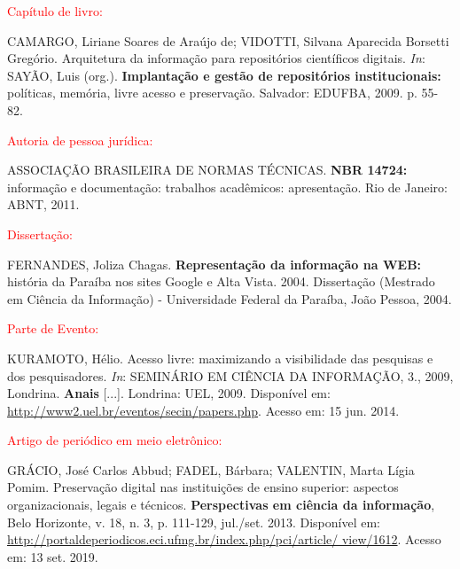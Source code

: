 \documentclass[
	12pt,				%
	openright,			%
	oneside,			%
	a4paper,			%
	english,			%
	french,				%
	spanish,			%
	brazil				%
	]{abntex2UFMT}
\begin{document}
\textcolor{red}{Capítulo de livro:}
\begin{flushleft}
\begin{SingleSpace}
CAMARGO, Liriane Soares de Araújo de; VIDOTTI, Silvana Aparecida Borsetti Gregório. Arquitetura da informação para repositórios científicos digitais. \textit{In}: SAYÃO, Luis (org.). \textbf{Implantação e gestão de repositórios institucionais:} políticas, memória, livre acesso e preservação. Salvador: EDUFBA, 2009. p. 55-82.
\end{SingleSpace}
\end{flushleft}

\textcolor{red}{Autoria de pessoa jurídica:}
\begin{flushleft}
\begin{SingleSpace} 
ASSOCIAÇÃO BRASILEIRA DE NORMAS TÉCNICAS. \textbf{NBR 14724:} informação e documentação: trabalhos acadêmicos: apresentação. Rio de Janeiro: ABNT, 2011.
\end{SingleSpace}
\end{flushleft}

\textcolor{red}{Dissertação:}
\begin{flushleft}
\begin{SingleSpace} 
FERNANDES, Joliza Chagas. \textbf{Representação da informação na WEB:} história da Paraíba nos sites Google e Alta Vista. 2004. Dissertação (Mestrado em Ciência da Informação) - Universidade Federal da Paraíba, João Pessoa, 2004.
\end{SingleSpace}
\end{flushleft}

\textcolor{red}{Parte de Evento:}
\begin{flushleft}
\begin{SingleSpace} 
KURAMOTO, Hélio. Acesso livre: maximizando a visibilidade das pesquisas e dos pesquisadores. \textit{In}: SEMINÁRIO EM CIÊNCIA DA INFORMAÇÃO, 3., 2009, Londrina. \textbf{Anais} [...]. Londrina: UEL, 2009. Disponível em: \url{http://www2.uel.br/eventos/secin/papers.php}. Acesso em: 15 jun. 2014.
\end{SingleSpace}
\end{flushleft}

\textcolor{red}{Artigo de periódico em meio eletrônico:}
\begin{flushleft}
\begin{SingleSpace} 
GRÁCIO, José Carlos Abbud; FADEL, Bárbara; VALENTIN, Marta Lígia Pomim. Preservação digital nas instituições de ensino superior: aspectos organizacionais, legais e técnicos. \textbf{Perspectivas em ciência da informação}, Belo Horizonte, v. 18, n. 3, p. 111-129, jul./set. 2013. Disponível em: \url{http://portaldeperiodicos.eci.ufmg.br/index.php/pci/article/
view/1612}. Acesso em: 13 set. 2019.
\end{SingleSpace}
\end{flushleft}
\end{document}

